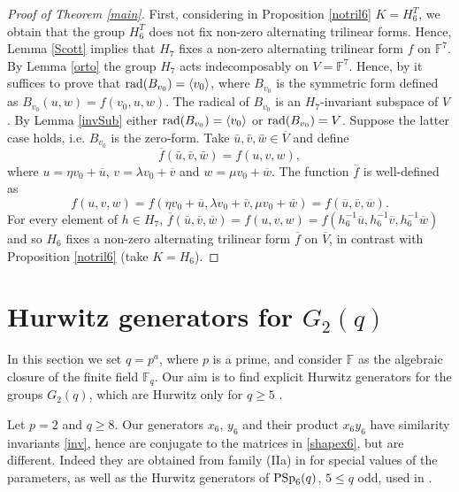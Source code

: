 \documentclass{amsart}
\theoremstyle{remark}
\begin{document}
\bigskip
\begin{proof}[Proof of Theorem {\rm \ref{main}}]
First, considering in Proposition \ref{notril6} $K=H_6^ T$, we obtain that the group $H_6^ T$ does not fix non-zero alternating trilinear forms. Hence,  Lemma \ref{Scott} implies that $H_7$ fixes a non-zero alternating trilinear form $f$  on ${\mathbb{F}}^ 7$.
By Lemma \ref{orto} the group $H_7$ acts indecomposably on $V={\mathbb{F}}^ 7$. Hence, by
\cite[(10.9)]{A} it suffices to prove that  ${\mathop{\rm rad}\nolimits }(B_{v_0})=\langle v_0\rangle$, where
$B_{v_0}$ is the symmetric form defined as $B_{v_0}(u,w)=f(v_0,u,w)$.
The radical of $B_{v_0}$ is an $H_7$-invariant subspace of $V$. 
By Lemma \ref{invSub} either ${\mathop{\rm rad}\nolimits }(B_{v_0})=\langle v_0\rangle$ or ${\mathop{\rm rad}\nolimits }(B_{v_0})=V$. 
Suppose the latter case holds, i.e.  $B_{v_0}$ is the zero-form.
Take $\bar u,\bar v,\bar w\in \overline{V}$ and define
$${\overline{f}}(\bar u,\bar v,\bar w)=f(u, v, w),$$
where
$u=\eta v_0+\overline{u}$, $v=\lambda v_0+\overline{v}$ and $w=\mu v_0+\overline{w}$.
The function ${\overline{f}}$ is well-defined as
$$
f(u,v,w)  =f(\eta v_0+\overline{u},\lambda v_0+\overline{v},\mu v_0+\overline{w} )=
f(\overline{u},\overline{v},\overline{w}).$$
For every element of $h\in H_7$,
${\overline{f}}(\overline{u},\overline{v},\overline{w})= f(u,v,w)=
f(h_6^ {-1}\overline{u},h_6^ {-1}\overline{v},h_6^{-1}\overline{w})$
 and so
$H_6$ fixes a non-zero alternating trilinear form ${\overline{f}}$ on $\overline{V}$, in contrast with Proposition \ref{notril6} (take $K=H_6$).
\end{proof}

\section{Hurwitz generators for $G_2(q)$}

In this section we set $q=p^a$, where $p$ is a prime, and consider ${\mathbb{F}}$ as the algebraic closure of the finite field ${\mathbb{F}}_q$. Our aim is to find explicit Hurwitz generators for the groups $G_2(q)$,
which are Hurwitz only for $q\geq 5$ \cite{Ma}. 

Let $p=2$ and $q\geq 8$. Our generators $x_6$, $y_6$ and their product $x_6y_6$ have similarity invariants \eqref{inv}, 
hence are conjugate to the matrices in \eqref{shapex6}, but are different. Indeed they are obtained from family (IIa) in \cite{V3} for special values of the parameters, as well as  the Hurwitz  
generators of ${\mathop{\rm PSp}\nolimits}_6(q)$, $5\le q$ odd, 
used in  \cite{TV}.  
\end{document}
